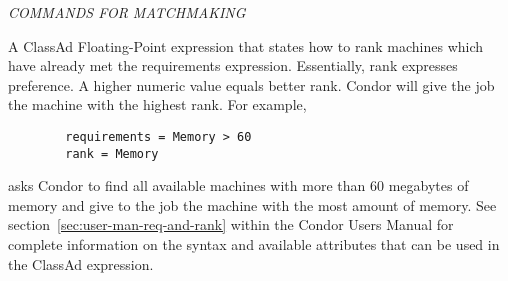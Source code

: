 \emph{COMMANDS FOR MATCHMAKING}
\begin{description} 


\item[rank = $<$ClassAd Float Expression$>$]
A ClassAd Floating-Point
expression that states how to rank machines which have already met the requirements
expression. Essentially, rank expresses preference.  A higher numeric value
equals better rank. Condor will give the job the machine with the
highest rank.  For example,
\begin{verbatim}
        requirements = Memory > 60
        rank = Memory
\end{verbatim}
asks Condor to find all available machines with more than 60 megabytes of memory
and give to the job the machine with the most amount of memory.
See section~\ref{sec:user-man-req-and-rank} 
within the Condor Users
Manual for complete information on the syntax and available attributes
that can be used in the ClassAd expression.



\end{description}
